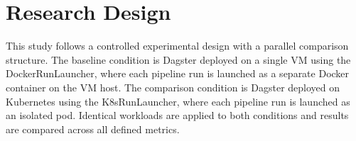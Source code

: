 
\section{Research Design}
\label{sec:research-design}

This study follows a controlled experimental design with a parallel comparison structure. The baseline condition is Dagster deployed on a single VM using the DockerRunLauncher, where each pipeline run is launched as a separate Docker container on the VM host. The comparison condition is Dagster deployed on Kubernetes using the K8sRunLauncher, where each pipeline run is launched as an isolated pod. Identical workloads are applied to both conditions and results are compared across all defined metrics.
